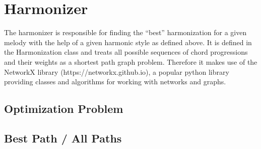 \section{Harmonizer}
The harmonizer is responsible for finding the ``best'' harmonization for a given melody with the help of a given harmonic style as defined above. It is defined in the Harmonization class and treats all possible sequences of chord progressions and their weights as a shortest path graph problem. Therefore it makes use of the NetworkX library (https://networkx.github.io), a popular python library providing classes and algorithms for working with networks and graphs. 

\subsection{Optimization Problem}

\subsection{Best Path / All Paths}
